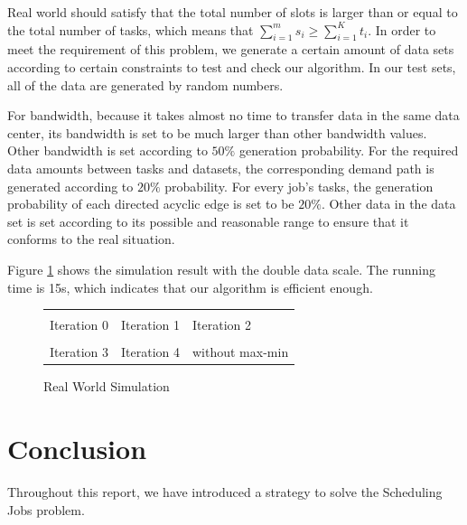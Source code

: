 \documentclass{llncs}
\begin{document}
Real world should satisfy that the total number of slots is larger than or equal to the total number of tasks, which means that $\sum_{i=1}^m s_i\geq \sum_{i=1}^K t_i$. In order to meet the requirement of this problem, we generate a certain amount of data sets according to certain constraints to test and check our algorithm. In our test sets, all of the data are generated by random numbers.

For bandwidth, because it takes almost no time to transfer data in the same data center, its bandwidth is set to be much larger than other bandwidth values. Other bandwidth is set according to $50\%$ generation probability. For the required data amounts between tasks and datasets, the corresponding demand path is generated according to $20\%$ probability. For every job's tasks, the generation probability of each directed acyclic edge is set to be $20\%$. Other data in the data set is set according to its possible and reasonable range to ensure that it conforms to the real situation.

Figure \ref{fig:real} shows the simulation result with the double data scale. The running time is 15s, which indicates that our algorithm is efficient enough.

\begin{figure}[h]
    \centering
    \begin{tabular}{lll}
          &  &  \\
         \hspace*{2em} Iteration 0 & \hspace*{2em} Iteration 1  &\hspace*{2em} Iteration 2 \\
      &  &
     
    \\
         \hspace*{2em} Iteration 3 &\hspace*{2em} Iteration 4 & 
        \hspace*{2em} without max-min
        \\
    \end{tabular}
    \caption{Real World Simulation}
    \label{fig:real}
\end{figure}

\section{Conclusion}

Throughout this report, we have introduced a strategy to solve the Scheduling Jobs problem.
\end{document}
